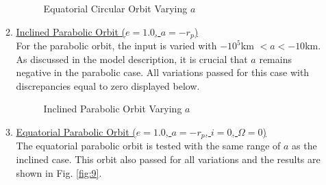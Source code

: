 \begin{itemize}
\begin{enumerate}
\begin{figure}[H]
			\caption{Equatorial Circular Orbit Varying $a$}\label{fig:7}
		\end{figure}
		\pagebreak
		\item \underline{Inclined Parabolic Orbit ($e=1.0$, \quad $a=-r_p$)}\\
		For the parabolic orbit, the input is varied with $-10^5$km $<a < -10$km. As discussed in the model description, it is crucial that $a$ remains negative in the parabolic case. All variations passed for this case with discrepancies equal to zero displayed below.
		\begin{figure}[H] \label{fig:8}
			\centering
			\caption{Inclined Parabolic Orbit Varying $a$}
		\end{figure}
		\item \underline{Equatorial Parabolic Orbit ($e=1.0$, \quad $a=-r_p$, \quad $i=0$, \quad $\Omega=0$)}\\
		The equatorial parabolic orbit is tested with the same range of $a$ as the inclined case. This orbit also passed for all variations and the results are shown in Fig. \ref{fig:9}.

\end{enumerate}
\end{itemize}
